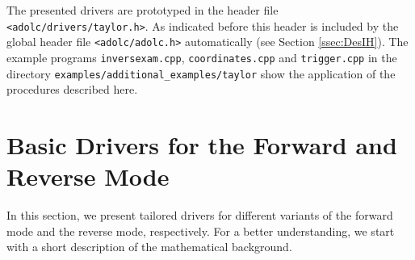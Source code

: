 \documentclass[11pt,twoside]{article}
\begin{document}
The presented drivers are prototyped in the header file 
\verb=<adolc/drivers/taylor.h>=. As indicated before this header
is included by the global header file \verb=<adolc/adolc.h>= automatically
(see Section \ref{ssec:DesIH}). 
The example programs \verb=inversexam.cpp=, \verb=coordinates.cpp= and 
\verb=trigger.cpp=  in the directory \verb=examples/additional_examples/taylor= 
show the application of the procedures described here.
%
%
\section{Basic Drivers for the Forward and Reverse Mode}
\label{forw_rev_ad}
%
In this section, we present tailored drivers for different
variants of the forward mode and the reverse mode, respectively.
For a better understanding, we start with a short 
description of the mathematical background.
\end{document}
